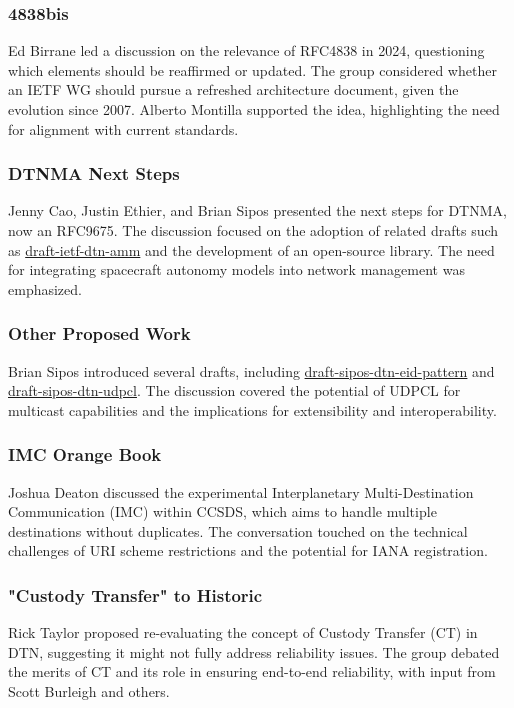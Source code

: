 \documentclass{article}
\begin{document}
\subsubsection{4838bis}
Ed Birrane led a discussion on the relevance of RFC4838 in 2024, questioning which elements should be reaffirmed or updated. The group considered whether an IETF WG should pursue a refreshed architecture document, given the evolution since 2007. Alberto Montilla supported the idea, highlighting the need for alignment with current standards.

\subsubsection{DTNMA Next Steps}
Jenny Cao, Justin Ethier, and Brian Sipos presented the next steps for DTNMA, now an RFC9675. The discussion focused on the adoption of related drafts such as \href{https://datatracker.ietf.org/doc/html/draft-ietf-dtn-amm}{draft-ietf-dtn-amm} and the development of an open-source library. The need for integrating spacecraft autonomy models into network management was emphasized.

\subsubsection{Other Proposed Work}
Brian Sipos introduced several drafts, including \href{https://datatracker.ietf.org/doc/html/draft-sipos-dtn-eid-pattern}{draft-sipos-dtn-eid-pattern} and \href{https://datatracker.ietf.org/doc/html/draft-sipos-dtn-udpcl}{draft-sipos-dtn-udpcl}. The discussion covered the potential of UDPCL for multicast capabilities and the implications for extensibility and interoperability.

\subsubsection{IMC Orange Book}
Joshua Deaton discussed the experimental Interplanetary Multi-Destination Communication (IMC) within CCSDS, which aims to handle multiple destinations without duplicates. The conversation touched on the technical challenges of URI scheme restrictions and the potential for IANA registration.

\subsubsection{"Custody Transfer" to Historic}
Rick Taylor proposed re-evaluating the concept of Custody Transfer (CT) in DTN, suggesting it might not fully address reliability issues. The group debated the merits of CT and its role in ensuring end-to-end reliability, with input from Scott Burleigh and others.
\end{document}
